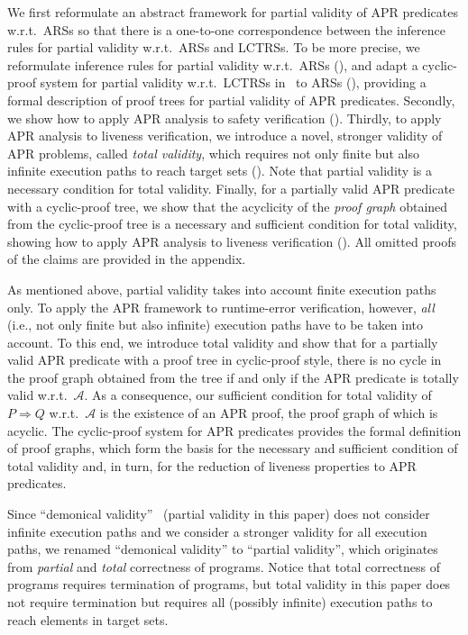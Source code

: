 \documentclass[10pt,a4paper]{article}
\def\cA{\mathcal{A}}
\newcommand{\ReachPred}[2]{#1 \Rightarrow #2}
\begin{document}
We first reformulate an abstract framework for partial validity of APR predicates w.r.t.\ ARSs so that there is a one-to-one correspondence between the inference rules for partial validity w.r.t.\ ARSs and LCTRSs.
To be more precise, we reformulate inference rules for partial validity w.r.t.\ ARSs (), and adapt a cyclic-proof system for partial validity w.r.t.\ LCTRSs in~\cite[Section~3.2]{KN24jip} to ARSs (), providing a formal description of proof trees for partial validity of APR predicates.
Secondly, we show how to apply APR analysis to safety verification ().
Thirdly, to apply APR analysis to liveness verification, we introduce a novel, stronger validity of APR problems, called \emph{total validity}, which requires not only finite but also infinite execution paths to reach target sets ().
Note that partial validity is a necessary condition for total validity.
Finally, for a partially valid APR predicate with a cyclic-proof tree, we show that the acyclicity of the \emph{proof graph} obtained from the cyclic-proof tree is a necessary and sufficient condition for total validity, showing how to apply APR analysis to liveness verification ().
All omitted proofs of the claims are provided in the appendix.

As mentioned above, partial validity takes into account finite execution paths only.
To apply the APR framework to runtime-error verification, however, \emph{all} (i.e., not only finite but also infinite) execution paths have to be taken into account.
To this end, we introduce total validity and
show that for a partially valid APR predicate with a proof tree in cyclic-proof style,
there is no cycle in the proof graph obtained from the tree if and only if the APR predicate is totally valid w.r.t.\ $\cA$.
As a consequence, our sufficient condition for total validity of $\ReachPred{P}{Q}$ w.r.t.\ $\cA$ is the existence of an APR proof, the proof graph of which is acyclic.
The cyclic-proof system for APR predicates provides the formal definition of proof graphs, which form the basis for the necessary and sufficient condition of total validity and, in turn, for the reduction of liveness properties to APR predicates.

Since ``demonical validity''~\cite{CL18} (partial validity in this paper) does not consider infinite execution paths and we consider a stronger validity for all execution paths, we renamed ``demonical validity'' to ``partial validity'', which originates from \emph{partial} and \emph{total} correctness of programs.
Notice that total correctness of programs requires termination of programs, but total validity in this paper does not require termination but requires all (possibly infinite) execution paths to reach elements in target sets.
\end{document}
